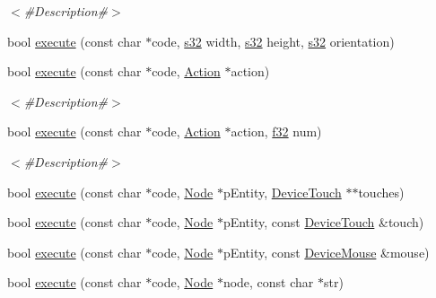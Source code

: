 \begin{DoxyCompactItemize}
\begin{DoxyCompactList}\small\item\em $<$\#\+Description\#$>$ \end{DoxyCompactList}\item 
bool \mbox{\hyperlink{classnjli_1_1_world_lua_virtual_machine_a104f43ff49f5478040eb592686cca9fa}{execute}} (const char $\ast$code, \mbox{\hyperlink{_util_8h_aa62c75d314a0d1f37f79c4b73b2292e2}{s32}} width, \mbox{\hyperlink{_util_8h_aa62c75d314a0d1f37f79c4b73b2292e2}{s32}} height, \mbox{\hyperlink{_util_8h_aa62c75d314a0d1f37f79c4b73b2292e2}{s32}} orientation)
\item 
bool \mbox{\hyperlink{classnjli_1_1_world_lua_virtual_machine_a02bcf617fdf1b7958846e585e870506e}{execute}} (const char $\ast$code, \mbox{\hyperlink{classnjli_1_1_action}{Action}} $\ast$action)
\begin{DoxyCompactList}\small\item\em $<$\#\+Description\#$>$ \end{DoxyCompactList}\item 
bool \mbox{\hyperlink{classnjli_1_1_world_lua_virtual_machine_a4fce503e637d2425c53e9e6afd486e02}{execute}} (const char $\ast$code, \mbox{\hyperlink{classnjli_1_1_action}{Action}} $\ast$action, \mbox{\hyperlink{_util_8h_a5f6906312a689f27d70e9d086649d3fd}{f32}} num)
\begin{DoxyCompactList}\small\item\em $<$\#\+Description\#$>$ \end{DoxyCompactList}\item 
bool \mbox{\hyperlink{classnjli_1_1_world_lua_virtual_machine_a177236bafc9183342e861ac9595c05be}{execute}} (const char $\ast$code, \mbox{\hyperlink{classnjli_1_1_node}{Node}} $\ast$p\+Entity, \mbox{\hyperlink{classnjli_1_1_device_touch}{Device\+Touch}} $\ast$$\ast$touches)
\item 
bool \mbox{\hyperlink{classnjli_1_1_world_lua_virtual_machine_a5482e7a538b9456f67d247df309093e9}{execute}} (const char $\ast$code, \mbox{\hyperlink{classnjli_1_1_node}{Node}} $\ast$p\+Entity, const \mbox{\hyperlink{classnjli_1_1_device_touch}{Device\+Touch}} \&touch)
\item 
bool \mbox{\hyperlink{classnjli_1_1_world_lua_virtual_machine_a3e51d4df76d364b8affa254b1cce2ee6}{execute}} (const char $\ast$code, \mbox{\hyperlink{classnjli_1_1_node}{Node}} $\ast$p\+Entity, const \mbox{\hyperlink{classnjli_1_1_device_mouse}{Device\+Mouse}} \&mouse)
\item 
bool \mbox{\hyperlink{classnjli_1_1_world_lua_virtual_machine_ad12a6636f0f41cdf9bff6b5db1862f8d}{execute}} (const char $\ast$code, \mbox{\hyperlink{classnjli_1_1_node}{Node}} $\ast$node, const char $\ast$str)
$$
\end{DoxyCompactItemize}
